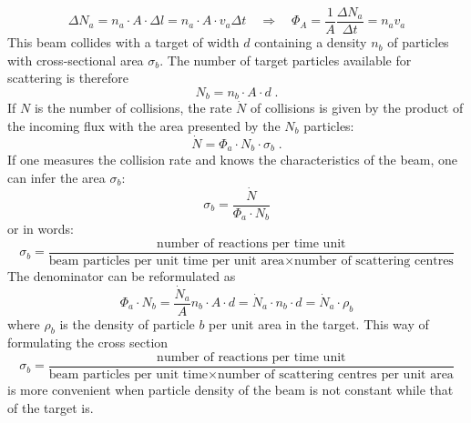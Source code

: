 \documentclass[12pt]{article}
\begin{document}
\begin{equation}\label{eq:fluxa}
\Delta N_a=n_a\cdot A\cdot\Delta l=n_a \cdot A \cdot v_a\Delta t
\quad 
\Rightarrow 
\quad
\Phi_A=\frac{1}{A}\frac{\Delta N_a}{\Delta t}=n_a v_a
\end{equation}
This beam collides with a target of width $d$ containing a density $n_b$ of particles with cross-sectional area $\sigma_b$. The number of target particles available for scattering is therefore
\[N_b=n_b\cdot A\cdot d\;.\]
If $N$ is the number of collisions, the rate $\dot N$ of collisions is given by the product of the incoming flux with the area presented by the $N_b$ particles:
\begin{equation}\label{eq:ndot}
	\dot N=\Phi_a\cdot N_b\cdot \sigma_b\;.
\end{equation}
If one measures the collision rate and knows the characteristics of the beam, one can infer the area $\sigma_b$:
\[\sigma_b=\frac{\dot N}{\Phi_a\cdot N_b}\]
or in words:
\[\sigma_b=\frac{\mbox{number of reactions per time unit}}{\mbox{beam particles per unit time per unit area} \times \mbox{number of scattering centres}}\]
The denominator can be reformulated as
\[\Phi_a\cdot N_b=\frac{\dot N_a}{A} n_b\cdot A\cdot d=\dot N_a \cdot n_b\cdot d=\dot N_a \cdot \rho_b\]
where $\rho_b$ is the density of particle $b$ per unit area in the target. This way of formulating the cross section
\[\sigma_b=\frac{\mbox{number of reactions per time unit}}{\mbox{beam particles per unit time} \times \mbox{number of scattering centres per unit area}}\]
is more convenient when particle density of the beam is not constant while that of the target is.
\end{document}
